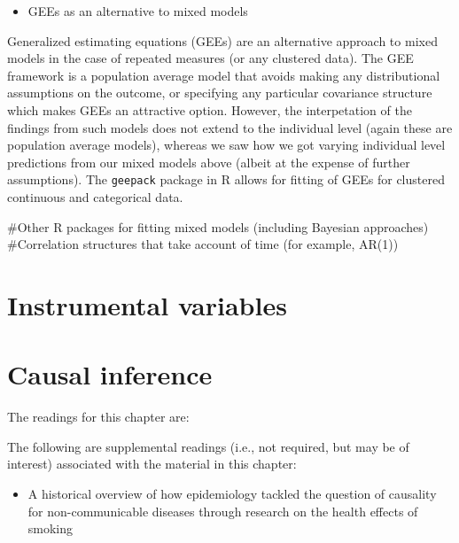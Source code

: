 \documentclass[
]{book}
\providecommand{\tightlist}{%
  \setlength{\itemsep}{0pt}\setlength{\parskip}{0pt}}
\begin{document}
\begin{itemize}
\tightlist
\item
  GEEs as an alternative to mixed models
\end{itemize}

Generalized estimating equations (GEEs) are an alternative approach to mixed models
in the case of repeated measures (or any clustered data). The GEE framework is a
population average model that avoids making any distributional assumptions on the
outcome, or specifying any particular covariance structure which makes GEEs an attractive
option. However, the interpetation of the findings from such models does not extend
to the individual level (again these are population average models), whereas we
saw how we got varying individual level predictions from our mixed models above (albeit
at the expense of further assumptions). The \texttt{geepack} package in R allows for fitting
of GEEs for clustered continuous and categorical data.

\#Other R packages for fitting mixed models (including Bayesian approaches)
\#Correlation structures that take account of time (for example, AR(1))

\hypertarget{instrumental-variables}{%
\chapter{Instrumental variables}\label{instrumental-variables}}

\hypertarget{causal-inference}{%
\chapter{Causal inference}\label{causal-inference}}

The readings for this chapter are:

The following are supplemental readings (i.e., not required, but may be of
interest) associated with the material in this chapter:

\begin{itemize}
\tightlist
\item
  \citet{samet2016epidemiology} A historical overview of how epidemiology tackled the question of causality for non-communicable diseases through research on the health effects of smoking
\end{itemize}

  
\end{document}
